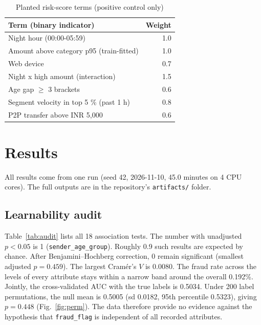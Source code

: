 \documentclass[conference]{IEEEtran}
\begin{document}
\begin{table}[t]
\centering
\caption{Planted risk-score terms (positive control only)}\label{tab:pcterms}
\footnotesize
\begin{tabular}{@{}lr@{}}
\toprule
Term (binary indicator) & Weight \\
\midrule
Night hour (00:00-05:59) & 1.0 \\
Amount above category p95 (train-fitted) & 1.0 \\
Web device & 0.7 \\
Night x high amount (interaction) & 1.5 \\
Age gap $\geq$ 3 brackets & 0.6 \\
Segment velocity in top 5 \% (past 1 h) & 0.8 \\
P2P transfer above INR 5,000 & 0.6 \\
\bottomrule
\end{tabular}
\end{table}

\section{Results}
All results come from one run (seed 42, 2026-11-10, 45.0 minutes on 4 CPU cores). The full outputs are in the repository's \texttt{artifacts/} folder.

\subsection{Learnability audit}\label{sec:audit}
Table~\ref{tab:audit} lists all 18 association tests. The number with unadjusted $p<0.05$ is 1 (\texttt{sender\_age\_group}). Roughly 0.9 such results are expected by chance. After Benjamini--Hochberg correction, 0 remain significant (smallest adjusted $p=0.459$). The largest Cram\'er's $V$ is 0.0080. The fraud rate across the levels of every attribute stays within a narrow band around the overall 0.192\%. Jointly, the cross-validated AUC with the true labels is 0.5034. Under 200 label permutations, the null mean is 0.5005 (sd 0.0182, 95th percentile 0.5323), giving $p=0.448$ (Fig.~\ref{fig:perm}). The data therefore provide no evidence against the hypothesis that \texttt{fraud\_flag} is independent of all recorded attributes.
\end{document}
